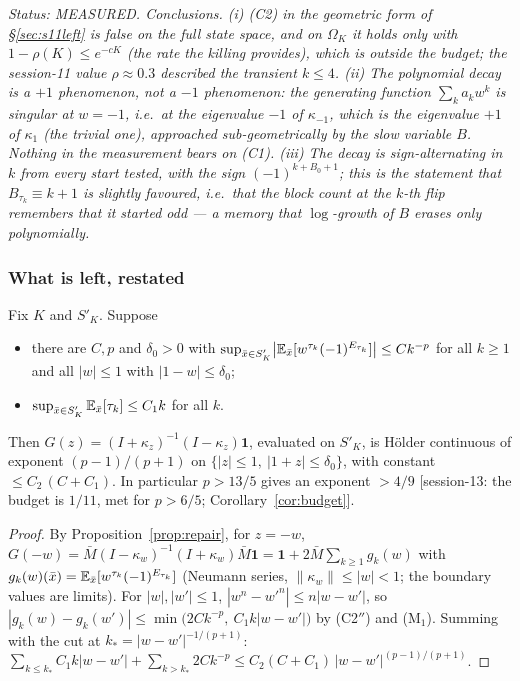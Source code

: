 \emph{Status: MEASURED.  Conclusions.  (i) (C2) in the geometric form
of \S\ref{sec:s11left} is false on the full state space, and on
$\Omega_K$ it holds only with $1-\rho(K)\le e^{-cK}$ (the rate the
killing provides), which is outside the budget; the session-11 value
$\rho\approx0.3$ described the transient $k\le4$.  (ii) The polynomial
decay is a $+1$ phenomenon, not a $-1$ phenomenon: the generating
function $\sum_ka_kw^k$ is singular at $w=-1$, i.e.\ at the eigenvalue
$-1$ of $\kappa_{-1}$, which is the eigenvalue $+1$ of $\kappa_1$ (the
trivial one), approached sub-geometrically by the slow variable $B$.
Nothing in the measurement bears on (C1).  (iii) The decay is
sign-alternating in $k$ from every start tested, with the sign
$(-1)^{k+B_0+1}$; this is the statement that $B_{\tau_k}\equiv k+1$ is
slightly favoured, i.e.\ that the block count at the $k$-th flip
remembers that it started odd --- a memory that $\log$-growth of $B$
erases only polynomially.}

\subsubsection{What is left, restated}\label{sec:s12left}

\begin{proposition}[polynomial parity decay suffices at $z=-1$]
\label{prop:holder}
Fix $K$ and $S'_K$.  Suppose
\begin{itemize}[leftmargin=2em]
\item[(C2$''$)] there are $C,p$ and $\delta_0>0$ with
$\sup_{\bar x\in S'_K}\bigl|\mathbb{E}_{\bar x}[w^{\tau_k}(-1)^{E_{\tau_k}}]\bigr|\le Ck^{-p}$
for all $k\ge1$ and all $|w|\le1$ with $|1-w|\le\delta_0$;
\item[(M$_1$)] $\sup_{\bar x\in S'_K}\mathbb{E}_{\bar x}[\tau_k]\le C_1k$ for all $k$.
\end{itemize}
Then $G(z)=(I+\kappa_z)^{-1}(I-\kappa_z)\mathbf 1$, evaluated on $S'_K$,
is H\"older continuous of exponent $(p-1)/(p+1)$ on
$\{|z|\le1,\ |1+z|\le\delta_0\}$, with constant
$\le C_2\,(C+C_1)$.  In particular $p>13/5$ gives an exponent $>4/9$
[session-13: the budget is $1/11$, met for $p>6/5$; Corollary~\ref{cor:budget}].
\end{proposition}

\begin{proof}
By Proposition~\ref{prop:repair}, for $z=-w$,
$G(-w)=\bar M(I-\kappa_w)^{-1}(I+\kappa_w)\bar M\mathbf 1
=\mathbf 1+2\bar M\sum_{k\ge1}g_k(w)$ with
$g_k(w)(\bar x)=\mathbb{E}_{\bar x}[w^{\tau_k}(-1)^{E_{\tau_k}}]$
(Neumann series, $\|\kappa_w\|\le|w|<1$; the boundary values are limits).
For $|w|,|w'|\le1$, $|w^n-w'^n|\le n|w-w'|$, so
$|g_k(w)-g_k(w')|\le\min\bigl(2Ck^{-p},\ C_1k|w-w'|\bigr)$ by (C2$''$)
and (M$_1$).  Summing with the cut at $k_*=|w-w'|^{-1/(p+1)}$:
$\sum_{k\le k_*}C_1k|w-w'|+\sum_{k>k_*}2Ck^{-p}
\le C_2(C+C_1)\,|w-w'|^{(p-1)/(p+1)}$.
\end{proof}

